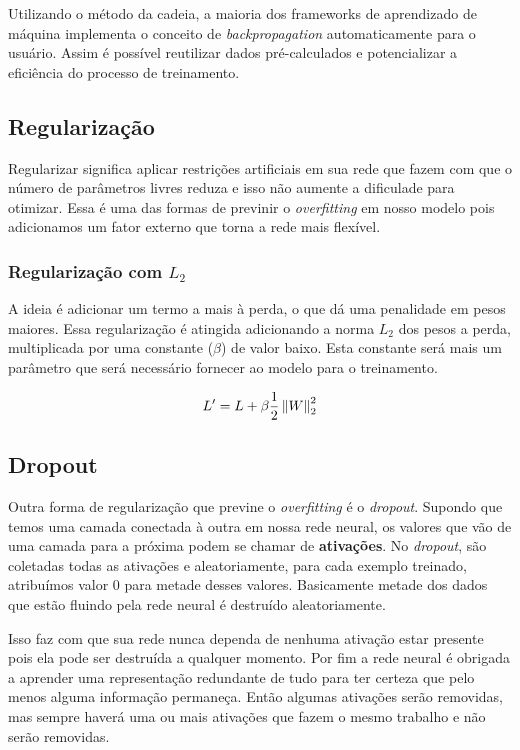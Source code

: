Utilizando o método da cadeia, a maioria dos frameworks de aprendizado
de máquina implementa o conceito de \textit{backpropagation}
automaticamente para o usuário. Assim é possível reutilizar dados
pré-calculados e potencializar a eficiência do processo de
treinamento.

\subsection{Regularização}

Regularizar significa aplicar restrições artificiais em sua rede que
fazem com que o número de parâmetros livres reduza e isso não aumente
a dificulade para otimizar. Essa é uma das formas de previnir o
\textit{overfitting} em nosso modelo pois adicionamos um fator externo
que torna a rede mais flexível.

\subsubsection{Regularização com $L_2$}

A ideia é adicionar um termo a mais à perda, o que dá uma penalidade
em pesos maiores. Essa regularização é atingida adicionando a norma $L_2$
dos pesos a perda, multiplicada por uma constante ($\beta$) de valor
baixo. Esta constante será mais um parâmetro que será necessário
fornecer ao modelo para o treinamento.

\begin{equation}
L' = L + \beta\frac{1}{2} \left\lVert W\right\rVert_2^2
\end{equation}

\subsection{Dropout}

Outra forma de regularização que previne o \textit{overfitting} é o
\textit{dropout}. Supondo que temos uma camada conectada à outra em
nossa rede neural, os valores que vão de uma camada para a próxima
podem se chamar de {\bf ativações}. No \textit{dropout}, são coletadas
todas as ativações e aleatoriamente, para cada exemplo treinado,
atribuímos valor 0 para metade desses valores. Basicamente metade dos
dados que estão fluindo pela rede neural é destruído aleatoriamente.

Isso faz com que sua rede nunca dependa de nenhuma ativação estar
presente pois ela pode ser destruída a qualquer momento. Por fim a
rede neural é obrigada a aprender uma representação redundante de tudo
para ter certeza que pelo menos alguma informação permaneça. Então
algumas ativações serão removidas, mas sempre haverá uma ou mais
ativações que fazem o mesmo trabalho e não serão removidas.

